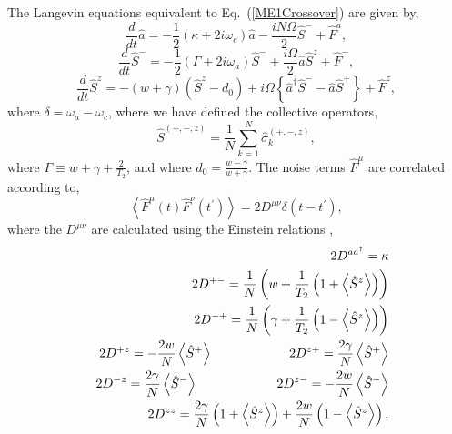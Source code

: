 \documentclass[aps,prl,twocolumn,
superscriptaddress,groupedaddress]{revtex4}
\begin{document}
The Langevin equations equivalent to Eq.~(\ref{ME1Crossover}) are given
by,
\begin{equation}
\frac{d}{dt} \hat{a}= -\frac{1}{2} (\kappa +2i\omega_c) \hat{a}
-\frac{i N \Omega}{2} \hat{S}^{-}
+\hat{F}^{a},
\label{La}
\end{equation}
\begin{equation}
\frac{d}{dt} \hat{S}^{-} =
-\frac{1}{2} \left(\Gamma +2 i \omega_a \right)  \hat{S}^{-}
+\frac{i \Omega}{2} \hat{a} \hat{S}^{z}
+\hat{F}^{-},
\label{Lsm}
\end{equation}
\begin{equation}
\frac{d}{dt} \hat{S}^{z} =
-(w+\gamma)\left( \hat{S}^{z} - d_0\right)
+i\Omega \left\{ \hat{a}^{\dagger}\hat{S}^{-} -
\hat{a}\hat{S}^{+} \right\}
+\hat{F}^{z},
\label{Lsz}
\end{equation}
where $\delta=\omega_{a}-\omega_{c}$, where we have defined the collective
operators,
\begin{equation}
\hat{S}^{(+,-,z)}=\frac{1}{N}\sum_{k=1}^N \hat{\sigma}_k^{(+,-,z)},
\nonumber
\end{equation}
where $\Gamma \equiv w+\gamma+\frac{2}{T_2}$, and where $d_0 =
\frac{w-\gamma}{w+\gamma}$. The noise terms $\hat F^\mu$ are correlated
according to,
\begin{equation}
\left< \hat{F}^{\mu}(t) \hat{F}^{\nu}(t^{\prime})\right> =
2 D^{\mu \nu} \delta(t-t^{\prime}),
\end{equation}
where the $D^{\mu \nu} $ are calculated using the Einstein relations
\cite{meystre2007elements},
\begin{eqnarray}
&& 2D^{a a^{\dagger}}= \kappa \nonumber \\
&& 2D^{+-}= \frac{1}{N}
\left(
  w + \frac{1}{T_2} \left(1 + \left< \hat{S}^{z} \right> \right)
\right) \nonumber \\
&& 2D^{-+}= \frac{1}{N}
\left(
  \gamma + \frac{1}{T_2} \left(1- \left< \hat{S}^{z} \right> \right)
\right) \nonumber \\
&& 2D^{+z}= -\frac{2w}{N} \left< \hat{S}^{+} \right>
\hspace{0.83in} 2D^{z+}= \frac{2\gamma}{N} \left< \hat{S}^{+} \right>
\nonumber \\
&& 2D^{-z}= \frac{2\gamma}{N} \left< \hat{S}^{-} \right>
\hspace{0.86in} 2D^{z-}= -\frac{2w}{N} \left< \hat{S}^{-} \right>
\nonumber \\
&& 2D^{zz}= \frac{2\gamma}{N}
\left(1+ \left< \hat{S}^{z} \right> \right) +
\frac{2w}{N}\left(1- \left< \hat{S}^{z} \right> \right).
\label{OpNoise1}
\end{eqnarray}
\end{document}
